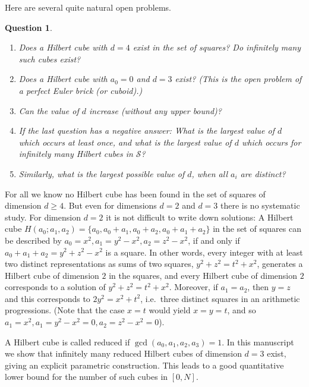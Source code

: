 \documentclass[10pt]{amsart}
\theoremstyle{plain}
\newtheorem{ques}[thm]{Question}
\def\cal{\mathcal}
\begin{document}
Here are several quite natural open problems.
\begin{ques}\label{firstques}
 \begin{enumerate}
\item
Does a Hilbert cube with $d=4$ exist in the set of squares? Do infinitely many such cubes exist? 
\item Does a Hilbert cube
with $a_0=0$ and $d=3$ exist?
(This is the open problem of a perfect Euler brick (or cuboid).)
\item
 Can the value of $d$ increase (without any upper bound)?
\item
If the last question has a negative answer:
What is the largest value of $d$ which occurs at least once,
and what is the largest value of $d$ which occurs for infinitely many Hilbert cubes in $\cal{S}$?
\item
Similarly, what is the largest possible value of $d$, when all $a_i$ are distinct?
\end{enumerate}
\end{ques}

For all we know no Hilbert cube has been found in the set of squares of dimension $d \geq 4$.
But even for dimensions $d=2$ and $d=3$ there is no systematic study.
For dimension $d=2$ it is not difficult to write down solutions:
A Hilbert cube $H(a_0;a_1,a_2)=\{a_0, a_0+a_1, a_0+a_2, a_0+a_1+a_2\}$ in the set of squares can be described by
$a_0=x^2, a_1=y^2-x^2, a_2=z^2-x^2$, if and only if
$a_0+a_1+a_2=y^2+z^2-x^2$ is a square.
In other words, every integer with at least two distinct representations as sums of two squares, $y^2+z^2=t^2+x^2$, generates a Hilbert cube of dimension $2$ in the squares, and every Hilbert 
cube of dimension $2$ corresponds to a solution of 
$y^2+z^2=t^2+x^2$.
Moreover, if $a_1=a_2$, then $y=z$ and this corresponds to $2y^2=x^2+t^2$, i.e.~three distinct squares in an arithmetic progressions. (Note that the case $x=t$ would yield $x=y=t$, and so $a_1=x^2, a_1=y^2-x^2=0, a_2=z^2-x^2=0$).

A Hilbert cube is called reduced if $\gcd(a_0,a_1,a_2,a_3)=1$.
In this manuscript we show that infinitely many reduced Hilbert cubes
of dimension $d=3$ exist, giving an explicit parametric construction. This leads to a good quantitative lower bound for the number of such cubes in $[0,N]$.

\end{document}
